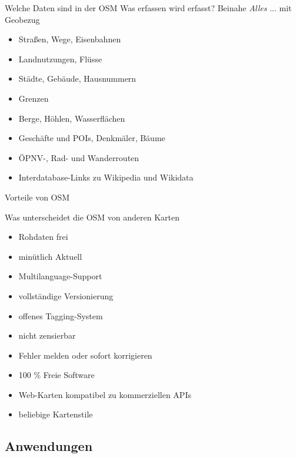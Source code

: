\documentclass{beamer}
\begin{document}
\begin{frame}{Welche Daten sind in der OSM}
  Was erfassen wird erfasst? Beinahe \emph{Alles} ... mit Geobezug
\pause
  \begin{itemize}
    \item Straßen, Wege, Eisenbahnen
    \item Landnutzungen, Flüsse
    \item Städte, Gebäude, Hausnummern
    \item Grenzen
    \item Berge, Höhlen, Wasserflächen
    \item Geschäfte und POIs, Denkmäler, Bäume
    \item ÖPNV-, Rad- und Wanderrouten
    \item Interdatabase-Links zu Wikipedia und Wikidata
\end{itemize}
\end{frame}

\begin{frame}{Vorteile von OSM}

Was unterscheidet die OSM von anderen Karten

  \begin{itemize}
    \item Rohdaten frei
    \item minütlich Aktuell
    \item Multilanguage-Support
    \item vollständige Versionierung
    \item offenes Tagging-System
    \item nicht zensierbar
    \item Fehler melden oder sofort korrigieren
    \item 100 \% Freie Software
    \item Web-Karten kompatibel zu kommerziellen APIs
    \item beliebige Kartenstile
\end{itemize}
\end{frame}
 
\subsection{Anwendungen}

\hypersetup{urlcolor=cyan}
\end{document}
